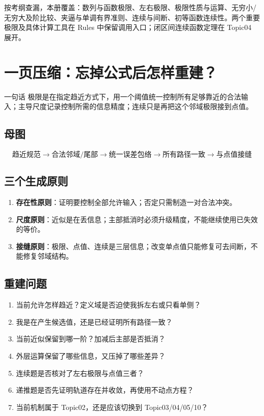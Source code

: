 \documentclass[11pt,a4paper]{ctexart}
\newcommand{\kw}[1]{\textbf{\color{deep}#1}}
\begin{document}
按考纲查漏，本册覆盖：数列与函数极限、左右极限、极限性质与运算、无穷小/无穷大及阶比较、夹逼与单调有界准则、连续与间断、初等函数连续性。两个重要极限及具体计算工具在 Rules 中保留调用入口；闭区间连续函数定理在 Topic04 展开。

\section{一页压缩：忘掉公式后怎样重建？}

\begin{corebox}{一句话}
极限是在指定趋近方式下，用一个阈值统一控制所有足够靠近的合法输入；主导尺度记录控制所需的信息精度；连续只是再把这个邻域极限接到点值。
\end{corebox}

\subsection{母图}
\[
\boxed{
\text{趋近规范}
\to \text{合法邻域/尾部}
\to \text{统一误差包络}
\to \text{所有路径一致}
\to \text{与点值接缝}}
\]

\subsection{三个生成原则}
\begin{enumerate}
  \item \kw{存在性原则}：证明要控制全部允许输入；否定只需制造一对合法冲突。
  \item \kw{尺度原则}：近似是在丢信息；主部抵消时必须升级精度，不能继续使用已失效的等价。
  \item \kw{接缝原则}：极限、点值、连续是三层信息；改变单点值只能修复可去间断，不能修复邻域结构。
\end{enumerate}

\subsection{重建问题}
\begin{enumerate}
  \item 当前允许怎样趋近？定义域是否迫使我拆左右或只看单侧？
  \item 我是在产生候选值，还是已经证明所有路径一致？
  \item 当前近似保留到哪一阶？加减后主部是否抵消？
  \item 外层运算保留了哪些信息，又压掉了哪些差异？
  \item 连续题是否核对了左右极限与点值三者？
  \item 递推题是否先证明轨道存在并收敛，再使用不动点方程？
  \item 当前机制属于 Topic02，还是应该切换到 Topic03/04/05/10？
\end{enumerate}
\end{document}
